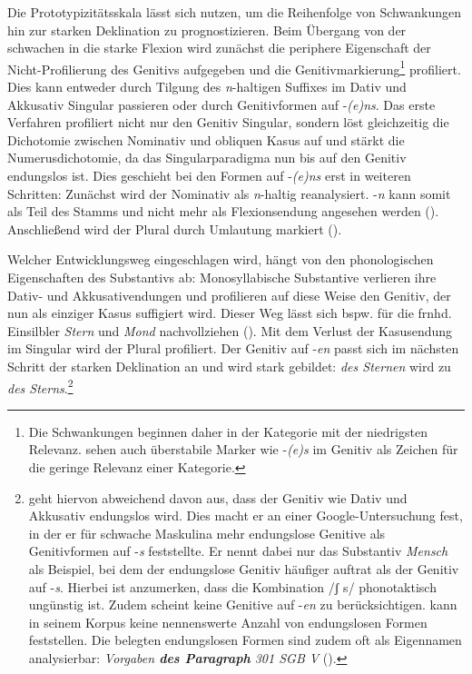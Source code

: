 Die Prototypizitätsskala lässt sich nutzen, um die Reihenfolge von Schwankungen hin zur starken Deklination zu prognostizieren. Beim Übergang von der schwachen in die starke Flexion wird zunächst die periphere Eigenschaft der Nicht-Profilierung des Genitivs aufgegeben und die Genitivmarkierung\footnote{Die Schwankungen beginnen daher in der Kategorie mit der niedrigsten Relevanz. \textcite[100--101]{Dammel.2006} sehen auch überstabile Marker wie -\textit{(e)s} im Genitiv als Zeichen für die geringe Relevanz einer Kategorie.} profiliert. Dies kann entweder durch Tilgung des \textit{n}-haltigen Suffixes im Dativ und Akkusativ Singular passieren oder durch Genitivformen auf -\textit{(e)ns}. Das erste Verfahren profiliert nicht nur den Genitiv Singular, sondern löst gleichzeitig die Dichotomie zwischen Nominativ und obliquen Kasus auf und stärkt die Numerusdichotomie, da das Singularparadigma nun bis auf den Genitiv endungslos ist. Dies geschieht bei den Formen auf -\textit{(e)ns} erst in weiteren Schritten: Zunächst wird der Nominativ als \textit{n}-haltig reanalysiert. -\textit{n} kann somit als Teil des Stamms und nicht mehr als Flexionsendung angesehen werden (\cite[154--155]{Eisenberg.2013}). Anschließend wird der Plural durch Umlautung markiert (\cite[70]{Nubling.2017}).  



Welcher Entwicklungsweg eingeschlagen wird, hängt von den phonologischen Eigenschaften des Substantivs ab: Monosyllabische Substantive verlieren ihre Dativ- und Akkusativendungen und profilieren auf diese Weise den Genitiv, der nun als einziger Kasus suffigiert wird. Dieser Weg lässt sich bspw. für die frnhd. Einsilbler \textit{Stern} und \textit{Mond} nachvollziehen (\cite[120--121]{Kopcke.2000}). Mit dem Verlust der Kasusendung im Singular wird der Plural profiliert. Der Genitiv auf -\textit{en} passt sich im nächsten Schritt der starken Deklination an und wird stark gebildet: \textit{des Sternen} wird zu \textit{des Sterns}.\footnote{\textcite[77]{Poitou.2004} geht hiervon abweichend davon aus, dass der Genitiv wie Dativ und Akkusativ endungslos wird. Dies macht er an einer Google-Untersuchung fest, in der er für schwache Maskulina mehr endungslose Genitive als Genitivformen auf -\textit{s} feststellte. Er nennt dabei nur das Substantiv \textit{Mensch} als Beispiel, bei dem der endungslose Genitiv häufiger auftrat als der Genitiv auf -\textit{s}. Hierbei ist anzumerken, dass die Kombination /ʃ s/ phonotaktisch ungünstig ist. Zudem scheint \textcite{Poitou.2004} keine Genitive auf -\textit{en} zu berücksichtigen. \textcite[64]{Krischke.2012} kann in seinem Korpus keine nennenswerte Anzahl von endungslosen Formen feststellen. Die belegten endungslosen Formen sind zudem oft als Eigennamen analysierbar: \textit{Vorgaben \textbf{des Paragraph} 301 SGB V} (\cite[64]{Krischke.2012}).} 



